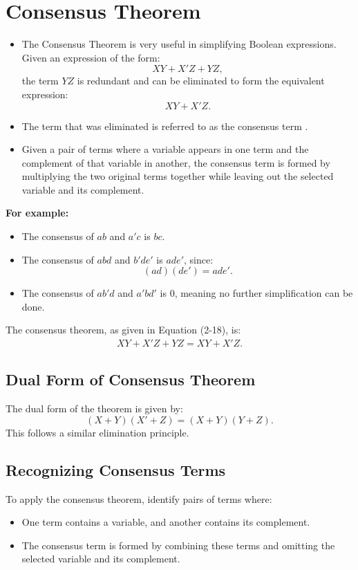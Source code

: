\section{Consensus Theorem}
\begin{itemize}
\item The Consensus Theorem is very useful in simplifying Boolean expressions. Given an expression of the form:
\[
XY + X'Z + YZ,
\]
the term \( YZ \) is redundant and can be eliminated to form the equivalent expression:
\[
XY + X'Z.
\]

\item The term that was eliminated is referred to as the \color{blue} consensus term \color{black}. 
\item Given a pair of terms where a variable appears in one term and the complement of that variable in another, the consensus term is formed by multiplying the two original terms together while leaving out the selected variable and its complement.
\end{itemize}

\textbf{For example:}
\begin{itemize}
    \item The consensus of \( ab \) and \( a'c \) is \( bc \).
    \item The consensus of \( abd \) and \( b'de' \) is \( ade' \), since:
    \[
    (ad)(de') = ade'.
    \]
    \item The consensus of \( ab'd \) and \( a'bd' \) is \( 0 \), meaning no further simplification can be done.
\end{itemize}

The consensus theorem, as given in Equation (2-18), is:
\begin{align}
XY + X'Z + YZ = XY + X'Z. \label{eq:con}
\end{align}

\subsection{Dual Form of Consensus Theorem}
The dual form of the theorem is given by:
\[
(X + Y)(X' + Z) = (X + Y)(Y + Z).
\]
This follows a similar elimination principle.

\subsection{Recognizing Consensus Terms}
To apply the consensus theorem, identify pairs of terms where:
\begin{itemize}
    \item One term contains a variable, and another contains its complement.
    \item The consensus term is formed by combining these terms and omitting the selected variable and its complement.
\end{itemize}

